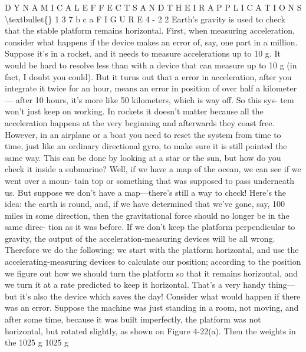 \documentclass[10pt,oneside]{article}
\begin{document}
D Y N A M I C A L  E F F E C T S  A N D  T H E I R  A P P L I C A T I O N S \textbackslash{}textbullet\{\} 1 3 7 b c a F I G U R E  4 - 2 2 Earth’s gravity is used to check that the stable platform remains horizontal. First, when measuring acceleration, consider what happens if the device makes an error of, say, one part in a million. Suppose it’s in a rocket, and it needs to measure accelerations up to 10 g. It would be hard to resolve less than with a device that can measure up to 10 g (in fact, I doubt you could). But it turns out that a error in acceleration, after you integrate it twice for an hour, means an error in position of over half a kilometer--- after 10 hours, it’s more like 50 kilometers, which is way off. So this sys- tem won’t just keep on working. In rockets it doesn’t matter because all the acceleration happens at the very beginning and afterwards they coast free. However, in an airplane or a boat you need to reset the system from time to time, just like an ordinary directional gyro, to make sure it is still pointed the same way. This can be done by looking at a star or the sun, but how do you check it inside a submarine? Well, if we have a map of the ocean, we can see if we went over a moun- tain top or something that was supposed to pass underneath us. But suppose we don’t have a map---there’s still a way to check! Here’s the idea: the earth is round, and, if we have determined that we’ve gone, say, 100 miles in some direction, then the gravitational force should no longer be in the same direc- tion as it was before. If we don’t keep the platform perpendicular to gravity, the output of the acceleration-measuring devices will be all wrong. Therefore we do the following: we start with the platform horizontal, and use the accelerating-measuring devices to calculate our position; according to the position we figure out how we should turn the platform so that it remains horizontal, and we turn it at a rate predicted to keep it horizontal. That’s a very handy thing---but it’s also the device which saves the day! Consider what would happen if there was an error. Suppose the machine was just standing in a room, not moving, and after some time, because it was built imperfectly, the platform was not horizontal, but rotated slightly, as shown on Figure 4-22(a). Then the weights in the 1025 g 1025 g\par
\end{document}
